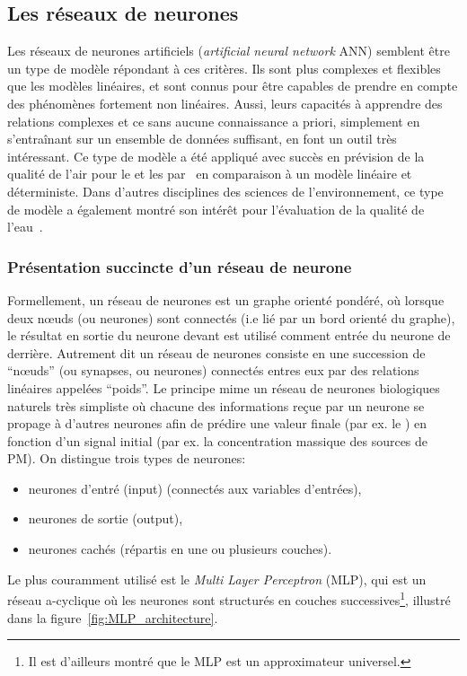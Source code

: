 \subsection{Les réseaux de neurones}%
\label{sub:les_réseaux_de_neurones}

Les réseaux de neurones artificiels (\textit{artificial neural network} ANN) semblent être
un type de modèle répondant à ces critères. Ils sont plus complexes et flexibles que les
modèles linéaires, et sont connus pour être capables de prendre en compte des phénomènes
fortement non linéaires. Aussi, leurs capacités à apprendre des relations complexes et ce
sans aucune connaissance a priori, simplement en s'entraînant sur un ensemble de données
suffisant, en font un outil très intéressant.
Ce type de modèle a été appliqué avec succès en prévision de la qualité de l'air pour le
 et les \PMdix{} par~\cite{kukkonenExtensive2003} en comparaison à un modèle
linéaire et déterministe. Dans d'autres disciplines des sciences de l'environnement, ce
type de modèle a également montré son intérêt pour l'évaluation de la qualité de
l'eau~\autocite{nathanApplication2017}.

\subsubsection{Présentation succincte d'un réseau de neurone}%
\label{ssub:présentation_succincte_d_un_réseau_de_neurone}


Formellement, un réseau de neurones est un graphe orienté pondéré, où lorsque deux
nœuds (ou neurones) sont connectés (i.e lié par un bord orienté du graphe), le résultat en
sortie du neurone devant est utilisé comment entrée du neurone de derrière.
Autrement dit un réseau de neurones consiste en une succession de ``nœuds'' (ou synapses, ou
neurones) connectés entres eux par des relations linéaires appelées ``poids''. Le principe
mime un réseau de neurones biologiques naturels très simpliste où chacune des
informations reçue par un neurone se propage à d'autres neurones afin de prédire une
valeur finale (par ex. le \POv) en fonction d'un signal initial (par ex. la
concentration massique des sources de PM).
On distingue trois types de neurones:
\begin{itemize}
    \item neurones d'entré (input) (connectés aux variables d'entrées),
    \item neurones de sortie (output),
    \item neurones cachés (répartis en une ou plusieurs couches).
\end{itemize}
Le plus couramment utilisé est le \textit{Multi Layer Perceptron} (MLP), qui est un
réseau a-cyclique où les neurones sont structurés en couches successives\footnote{Il est
d'ailleurs montré que le MLP est un approximateur universel.}, illustré dans la
figure~\ref{fig:MLP_architecture}.

